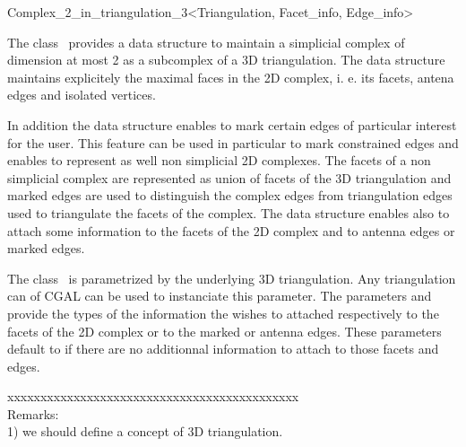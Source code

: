 

\begin{ccRefClass}{Complex_2_in_triangulation_3<Triangulation, Facet_info, Edge_info>}  



\ccDefinition
  
The class \ccRefName\ provides a data structure to maintain a 
simplicial complex of dimension at most 2
as a subcomplex of a 3D triangulation.
The data structure maintains explicitely the maximal faces
in the 2D complex, i. e. its facets, antena edges and 
isolated vertices.

In addition the data structure enables to mark
certain edges of particular interest for the user.
This feature can be used in particular
to mark constrained edges and enables 
to represent as well non simplicial 2D complexes.
The  facets of a non simplicial  complex are 
represented as union of facets of the 3D triangulation
and marked edges are used to distinguish  the complex edges
from triangulation edges used to triangulate
the facets of the complex.
The data structure enables also to attach some information to the
facets of the 2D complex and to antenna edges or  marked edges.  


\ccParameters
The class \ccRefName\ is parametrized by the underlying
3D triangulation.
Any triangulation can of CGAL can be used to instanciate this parameter.
The parameters  and 
provide the types of the information the wishes to attached
respectively to the facets of the 2D complex  or to the marked
or antenna edges. These parameters default to 
if there are no additionnal information to attach to those facets
and edges.


xxxxxxxxxxxxxxxxxxxxxxxxxxxxxxxxxxxxxxxxxxxx \\
Remarks: \\
1)  we should define a concept of 3D triangulation. \\


\end{ccRefClass}

